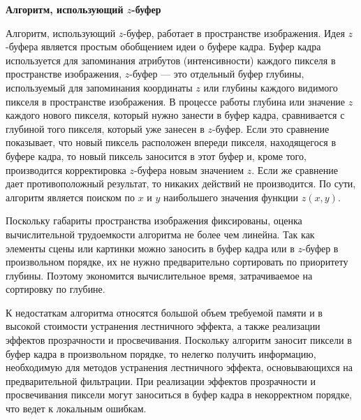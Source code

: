 
\textbf{Алгоритм, использующий $z$-буфер} %

Алгоритм, использующий $z$-буфер, работает в пространстве изображения. Идея $z$-буфера является простым обобщением идеи о буфере кадра. Буфер кадра используется для запоминания атрибутов (интенсивности) каждого пикселя в пространстве изображения, $z$-буфер --- это отдельный буфер глубины, используемый для запоминания координаты $z$ или глубины каждого видимого пикселя в пространстве изображения. В процессе работы глубина или значение $z$ каждого нового пикселя, который нужно занести в буфер кадра, сравнивается с глубиной того пикселя, который уже занесен в $z$-буфер. Если это сравнение показывает, что новый пиксель расположен впереди пикселя, находящегося в буфере кадра, то новый пиксель заносится в этот буфер и, кроме того, производится корректировка $z$-буфера новым значением $z$. Если же сравнение дает противоположный результат, то никаких действий не производится. По сути, алгоритм является поиском по $x$ и $y$ наибольшего значения функции $z(x, y)$.

Поскольку габариты пространства изображения фиксированы, оценка вычислительной трудоемкости алгоритма не более чем линейна. Так как элементы сцены или картинки можно заносить в буфер кадра или в $z$-буфер в произвольном порядке, их не нужно предварительно сортировать по приоритету глубины. Поэтому экономится вычислительное время, затрачиваемое на сортировку по глубине.

К недостаткам алгоритма относятся большой объем требуемой памяти и в высокой стоимости устранения лестничного эффекта, а также реализации эффектов прозрачности и просвечивания. Поскольку алгоритм заносит пиксели в буфер кадра в произвольном порядке, то нелегко получить информацию, необходимую для методов устранения лестничного эффекта, основывающихся на предварительной фильтрации. При реализации эффектов прозрачности и просвечивания пиксели могут заноситься в буфер кадра в некорректном порядке, что ведет к локальным ошибкам.~\cite{ZBuff}

